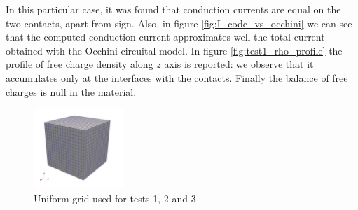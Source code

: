 \documentclass[11pt,a4paper]{article}
\begin{document}
In this particular case, it was found that conduction currents are equal on the two contacts, apart from sign. Also, in figure \ref{fig:I_code_vs_occhini} we can see that the computed conduction current approximates well the total current obtained with the Occhini circuital model. In figure \ref{fig:test1_rho_profile} the profile of free charge density along \(z\) axis is reported: we observe that it accumulates only at the interfaces with the contacts. Finally the balance of free charges is null in the material.
\begin{figure}
	\centering
	\includegraphics[width=0.3\textwidth]{pictures/uniform-grid.png}
	\caption{Uniform grid used for tests 1, 2 and 3}
	\label{fig:unif-grid}
\end{figure}
\end{document}
